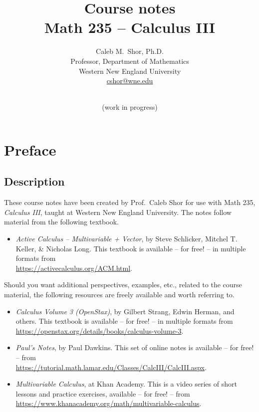 
\title{{\sc Course notes \\ Math 235 -- Calculus III}}
\date{\termsemester{} \termyear{} \\ (work in progress)}
\author{Caleb M.\ Shor, Ph.D. \\ Professor, Department of Mathematics \\ Western New England University \\ \href{mailto:cshor@wne.edu}{cshor@wne.edu}}
\vspace{-1in}
\maketitle
{}
\pagestyle{plain}

\vspace{-.5in}
\section*{Preface}
\subsection*{Description}
These course notes have been created by Prof.\ Caleb Shor for use with Math 235, \emph{Calculus III}, taught at Western New England University. The notes follow material from the following textbook.
\begin{itemize}
    \item \emph{Active Calculus -- Multivariable + Vector}, by Steve Schlicker, Mitchel T. Keller, \& Nicholas Long.
    This textbook is available -- for free! -- in multiple formats from \\
    \mbox{}\hfill\url{https://activecalculus.org/ACM.html}.\hfill\mbox{}
\end{itemize}

Should you want additional perspectives, examples, etc., related to the course material, the following resources are freely available and worth referring to.
\begin{itemize}
    \item \emph{Calculus Volume 3 (OpenStax)}, by Gilbert Strang, Edwin Herman, and others.
    This textbook is available -- for free! -- in multiple formats from \\ 
    \mbox{}\hfill\url{https://openstax.org/details/books/calculus-volume-3}.\hfill\mbox{}
    \item \emph{Paul's Notes}, by Paul Dawkins. 
    This set of online notes is available -- for free! -- from \\ \mbox{}\hfill  \url{https://tutorial.math.lamar.edu/Classes/CalcIII/CalcIII.aspx}.\hfill\mbox{}
    \item \emph{Multivariable Calculus}, at Khan Academy. This is a video series of short lessons and practice exercises, available -- for free! -- from
    \\ \mbox{}\hfill\url{https://www.khanacademy.org/math/multivariable-calculus}.\hfill\mbox{}
\end{itemize}

